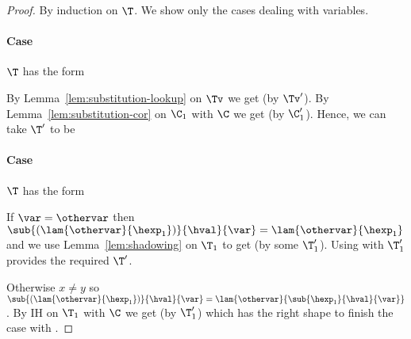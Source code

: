 \begin{proof}
By induction on $\T$.
We show only the cases dealing with variables.

\paragraph{Case \textnormal{}}

$\T$ has the form
\begin{prooftree}
\end{prooftree}
By Lemma~\ref{lem:substitution-lookup} on $\Tv$ we get  (by $\Tv'$).
By Lemma~\ref{lem:substitution-cor} on $\C_1$ with $\C$ we get  (by $\C_1'$).
Hence, we can take $\T'$ to be
\begin{prooftree}
\end{prooftree}

\paragraph{Case \textnormal{}}
$\T$ has the form
\begin{prooftree}
\end{prooftree}
If $\var = \othervar$ then $\sub{(\lam{\othervar}{\hexp_1})}{\hval}{\var} = \lam{\othervar}{\hexp_1}$ and we use Lemma~\ref{lem:shadowing} on $\T_1$ to get  (by some $\T_1'$).
Using  with $\T_1'$ provides the required $\T'$.

Otherwise $x \neq y$ so $\sub{(\lam{\othervar}{\hexp_1})}{\hval}{\var} = \lam{\othervar}{\sub{\hexp_1}{\hval}{\var}}$.
By IH on $\T_1$ with $\C$ we get  (by $\T_1'$) which has the right shape to finish the case with .

\end{proof}

